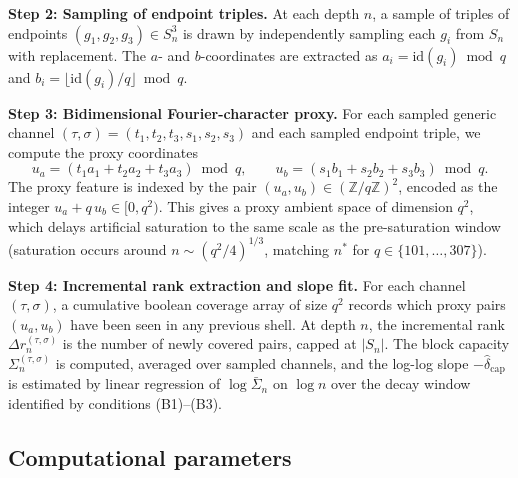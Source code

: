 \documentclass[11pt,a4paper]{article}
\newcommand{\Sigbar}{\bar{\Sigma}}
\newcommand{\Sigblock}{\Sigma_n^{(\tau,\sigma)}}
\newcommand{\dcap}{\delta_{\mathrm{cap}}}
\begin{document}
    \textbf{Step 2: Sampling of endpoint triples.}
    At each depth $n$, a sample of triples of endpoints $(g_1, g_2, g_3) \in S_n^3$ is drawn by
    independently sampling each $g_i$ from $S_n$ with replacement.
    The $a$- and $b$-coordinates are extracted as $a_i = \mathrm{id}(g_i) \bmod q$ and
    $b_i = \lfloor \mathrm{id}(g_i) / q \rfloor \bmod q$.

    \textbf{Step 3: Bidimensional Fourier-character proxy.}
    For each sampled generic channel $(\tau, \sigma) = (t_1,t_2,t_3,s_1,s_2,s_3)$ and each
    sampled endpoint triple, we compute the proxy coordinates
    \begin{equation}
      \label{eq:proxy-feature}
      u_a = (t_1 a_1 + t_2 a_2 + t_3 a_3) \bmod q, \qquad
      u_b = (s_1 b_1 + s_2 b_2 + s_3 b_3) \bmod q.
    \end{equation}
    The proxy feature is indexed by the pair $(u_a, u_b) \in (\mathbb{Z}/q\mathbb{Z})^2$,
    encoded as the integer $u_a + q\,u_b \in [0, q^2)$.
    This gives a proxy ambient space of dimension $q^2$, which delays artificial saturation to
    the same scale as the pre-saturation window (saturation occurs around
    $n \sim (q^2/4)^{1/3}$, matching $n^*$ for $q \in \{101, \ldots, 307\}$).

    \textbf{Step 4: Incremental rank extraction and slope fit.}
    For each channel $(\tau,\sigma)$, a cumulative boolean coverage array of size $q^2$ records
    which proxy pairs $(u_a, u_b)$ have been seen in any previous shell.
    At depth $n$, the incremental rank $\Delta r_n^{(\tau,\sigma)}$ is the number of newly
    covered pairs, capped at $|S_n|$.
    The block capacity $\Sigblock$ is computed, averaged over sampled channels, and the
    log-log slope $-\hat\dcap$ is estimated by linear regression of $\log\Sigbar_n$ on
    $\log n$ over the decay window identified by conditions (B1)--(B3).

  \subsection{Computational parameters}
    \label{sec:impl-params}
\end{document}
